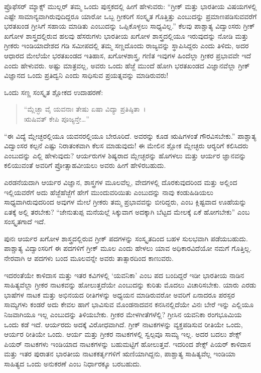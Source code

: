  ಪ್ರೊಫೆಸರ್ ಮ್ಯಾಕ್ಸ್ ಮುಲ್ಲರ್ ತಮ್ಮ ಒಂದು ಪುಸ್ತಕದಲ್ಲಿ ಹೀಗೆ ಹೇಳುವರು: “ಗ್ರೀಕ್ ಮತ್ತು ಭಾರತೀಯ ವಿಷಯಗಳಲ್ಲಿ ಎಷ್ಟೇ ಸಾಮಾನ್ಯವಾಗಿರುವುದಿದ್ದರೂ ಯಾರೋ ಒಬ್ಬ ಗ್ರೀಕರಿಗೆ ಸಂಸ್ಕೃತ ಗೊತ್ತಿತ್ತು ಎಂಬುದನ್ನು ಪ್ರಮಾಣಪಡಿಸುವವರೆಗೆ ಭರತಖಂಡ ಗ್ರೀಸಿಗೆ ಸಹಾಯ ಮಾಡಿತು ಎಂಬುದನ್ನು ಒಪ್ಪಿಕೊಳ್ಳಲು ಸಾಧ್ಯವಿಲ್ಲ.” ಕೆಲವು ಪಾಶ್ಚಾತ್ಯ ವಿದ್ವಾಂಸರು ಗ್ರೀಕ್ ಖಗೋಳ ಶಾಸ್ತ್ರದಲ್ಲಿರುವ ಹಲವು ಹೆಸರುಗಳು ಭಾರತೀಯ ಖಗೋಳ ಶಾಸ್ತ್ರದಲ್ಲಿಯೂ ಇರುವುದನ್ನು ನೋಡಿ ಮತ್ತು ಗ್ರೀಕರು ಇಂಡಿಯಾದೇಶದ ಗಡಿ ಸಮೀಪದಲ್ಲಿ ತಮ್ಮ ಸಣ್ಣದೊಂದು ರಾಜ್ಯವನ್ನು ಸ್ಥಾಪಿಸಿದ್ದರು ಎಂದು ತಿಳಿದು, ಅದರ ಆಧಾರದ ಮೇಲೆಯೇ ಭರತಖಂಡದ ಇತಿಹಾಸ, ಖಗೋಳಶಾಸ್ತ್ರ, ಗಣಿತ ಇವುಗಳ ಹಿಂದೆಲ್ಲಾ ಗ್ರೀಕರ ಪ್ರಭಾವವೇ ಇದೆ ಎಂದು ಹೇಳುವರು. ಅಷ್ಟು ಮಾತ್ರವಲ್ಲ, ಅವರು ಒಂದು ಹೆಜ್ಜೆ ಮುಂದೆ ಹೋಗಿ ಭರತಖಂಡದ ವಿಜ್ಞಾನವೆಲ್ಲಾ ಗ್ರೀಕ್ ವಿಜ್ಞಾನದ ಒಂದು ಪ್ರತಿದ್ವನಿ ಎಂದು ಸಾಧಿಸುವ ಪ್ರಯತ್ನವನ್ನು ಮಾಡಿರುವರು! 

 ಒಂದು ಸಣ್ಣ ಸಂಸ್ಕೃತ ಶ್ಲೋಕದ ಉದಾಹರಣೆ:

\begin{verse}
“ಮ್ಲೆಚ್ಛಾ ವೈ ಯವನಾಃ ತೇಷು ಏಷಾ ವಿದ್ಯಾ ಪ್ರತಿಷ್ಠಿತಾ~।\\ಋಷಿವತ್ ಕೇಪಿ ಪೂಜ್ಯನ್ತೇ…” 
\end{verse}

 “ಈ ವಿದ್ಯೆ ಮ್ಲೇಚ್ಛರಲ್ಲಿಯೂ ಯವನರಲ್ಲಿಯೂ ಬೇರೂರಿದೆ. ಅವರನ್ನು ಕೂಡ ಋಷಿಗಳಂತೆ ಗೌರವಿಸಬೇಕು.” ಪಾಶ್ಚಾತ್ಯ ವಿದ್ವಾಂಸರ ಕಲ್ಪನೆ ಎಷ್ಟು ನಿರಾತಂಕವಾಗಿ ಕೆಲಸ ಮಾಡುವುದು! ಈ ಮೇಲಿನ ಶ್ಲೋಕ ಮ್ಲೇಚ್ಛರು ಆರ‍್ಯರಿಗೆ ಕಲಿಸಿದರು ಎಂಬುದನ್ನು ಎಲ್ಲಿ ಹೇಳುವುದು? ಆರ್ಯರುಗಳ ಶಿಷ್ಯರಾದ ಮ್ಲೇಚ್ಛರನ್ನು ಹೊಗಳಲು ಮತ್ತು ಆರ್ಯರ ಜ್ಞಾನವನ್ನು ಕಲಿಯುವಂತೆ ಅವರಿಗೆ ಪ್ರೋತ್ಸಾಹವೀಯಲು ಅವರು ಹೀಗೆ ಹೇಳಿರಬಹುದು. 

 ಎರಡನೆಯದಾಗಿ ಆರ್ಯರ ವಿಜ್ಞಾನ, ಶಾಸ್ತ್ರಗಳ ಮೂಲವೆಲ್ಲ, ವೇದಗಳಲ್ಲಿ ದೊರಕುವುದರಿಂದ ಮತ್ತು ಅಲ್ಲಿಂದ ಇಲ್ಲಿಯವರೆಗೆ ಅದು ಹೆಜ್ಜೆಹೆಜ್ಜೆಗೆ ಹೇಗೆ ಮುಂದುವರಿಯಿತು ಎಂಬುದನ್ನು ನಾವು ಕಂಡುಹಿಡಿಯಲು ಸಾಧ್ಯವಾಗಿರುವುದರಿಂದ ಅವುಗಳ ಮೇಲೆ ಗ್ರೀಕರು ತಮ್ಮ ಪ್ರಭಾವವನ್ನು ಬೀರಿದ್ದರು, ಎಂಬ ಕ್ಲಿಷ್ಟವಾದ ಊಹೆಯನ್ನು ಏತಕ್ಕೆ ಅಲ್ಲಿ ತರಬೇಕು? “ಜೇನುತುಪ್ಪ ಮನೆಯಲ್ಲೆ ಸಿಕ್ಕುವಾಗ ಅದಕ್ಕಾಗಿ ಬೆಟ್ಟದ ಮೇಲಕ್ಕೆ ಏಕೆ ಹೋಗಬೇಕು” ಎಂಬ ಸಂಸ್ಕೃತಗಾದೆ ಇದೆ. 

 ಪುನಃ ಆರ್ಯರ ಖಗೋಳ ಶಾಸ್ತ್ರದಲ್ಲಿರುವ ಗ್ರೀಕ್ ಪದಗಳನ್ನು ಸಂಸ್ಕೃತದಿಂದ ಬಹಳ ಸುಲಭವಾಗಿ ಪಡೆಯಬಹುದು. ಪಾಶ್ಚಾತ್ಯ ವಿದ್ವಾಂಸರಿಗೆ ಈ ಪದಗಳಿಗೆ ಗ್ರೀಕ್ ಮೂಲ ಎಂದು ಹೇಳಲು ಯಾವ ಅಧಿಕಾರವಿದೆಯೋ ನಮಗೆ ಗೊತ್ತಿಲ್ಲ. ನೇರವಾಗಿ ಆ ಪದಗಳು ಬಂದ ಮೂಲವನ್ನೇ ಅವರು ತಾತ್ಸಾರದಿಂದ ಕಾಣುವರು. 

 ಇದರಂತೆಯೇ ಕಾಳಿದಾಸ ಮತ್ತು ಇತರ ಕವಿಗಳಲ್ಲಿ ‘ಯವನಿಕಾ’ ಎಂಬ ಪದ ಬಂದಿದ್ದರೆ ಇಡೀ ಭಾರತೀಯ ನಾಡಿನ ಸಾಹಿತ್ಯವೆಲ್ಲಾ ಗ್ರೀಕರ ನಾಟಕವನ್ನು ಹೋಲುತ್ತದೆಯೇ ಎಂಬುದನ್ನು ಕುರಿತು ಮೊದಲು ವಿಚಾರಿಸಬೇಕು. ಯಾರು ಎರಡು ಭಾಷೆಗಳ ನಾಟಕ ಮತ್ತು ಅಭಿನಯದ ರೀತಿಗಳನ್ನು ಅಧ್ಯಯನ ಮಾಡಿರುವರೋ ಅವರಿಗೆ ಏನಾದರೂ ಪರಸ್ಪರ ಸಾಮ್ಯಗಳು ಕಂಡರೆ ಅದು ಕೇವಲ ಹಾಗೆ ಭಾವಿಸುವ ಮೊಂಡನಾದವನ ಕನಸಿನಲ್ಲಿದೆಯೇ ವಿನಃ ಬೇರೆ ಇನ್ನು ಎಲ್ಲಿಯೂ ನಿಜವಾಗಿಯೂ ಇಲ್ಲ ಎಂಬುದನ್ನು ತಿಳಿಯಬೇಕು. ಗ್ರೀಕರ ಮೇಳಗೀತೆಗಳೆಲ್ಲಿ? ಗ್ರೀಸಿನ ಯವನಿಕಾ ರಂಗಭೂಮಿಯ ಒಂದು ಕಡೆ ಇದೆ. ಆರ್ಯರದು ಅದಕ್ಕೆ ವಿರೋಧವಾಗಿದೆ. ಗ್ರೀಕ್ ನಾಟಕಗಳನ್ನು ವ್ಯಕ್ತಪಡಿಸುವ ರೀತಿಯೇ ಒಂದು, ಆರ್ಯರ ರೀತಿಯೇ ಒಂದು. ಆರ್ಯ ಮತ್ತು ಗ್ರೀಕರ ನಾಟಕಗಳಲ್ಲಿ ಸ್ವಲ್ಪವೂ ಸಾಮ್ಯ ಇಲ್ಲ. ಅದರ ಬದಲು ಶೇಕ್ಸ್ ಪಿಯರ್ ನಾಟಕಗಳು ಇಂಡಿಯಾದ ನಾಟಕಗಳನ್ನು ಬಹುಮಟ್ಟಿಗೆ ಹೋಲುತ್ತವೆ. ಇದರಿಂದ ಶೇಕ್ಸ್ ಪಿಯರ್ ಕಾಳಿದಾಸ ಮತ್ತು ಇತರ ಪುರಾತನ ಭಾರತೀಯ ನಾಟಕಕರ್ತೃಗಳಿಗೆ ಋಣಿಯಾಗಿದ್ದನು, ಪಾಶ್ಚಾತ್ಯ ಸಾಹಿತ್ಯವೆಲ್ಲ ಇಂಡಿಯಾ ಸಾಹಿತ್ಯದ ಒಂದು ಅನುಕರಣೆ ಎಂಬ ನಿರ್ಧಾರಕ್ಕೂ ಬರಬಹುದು. 

